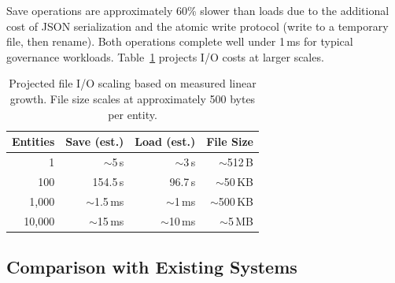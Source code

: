 \documentclass[10pt, twocolumn]{article}
\begin{document}
Save operations are approximately 60\% slower than loads due to the additional cost of JSON serialization and the atomic write protocol (write to a temporary file, then rename). Both operations complete well under 1\,ms for typical governance workloads. Table~\ref{tab:io-scale} projects I/O costs at larger scales.

\begin{table}[t]
\caption{Projected file I/O scaling based on measured linear growth. File size scales at approximately 500 bytes per entity.}
\label{tab:io-scale}
\centering
\small
\begin{tabular}{@{}rrrr@{}}
\toprule
\textbf{Entities} & \textbf{Save (est.)} & \textbf{Load (est.)} & \textbf{File Size} \\
\midrule
1 & $\sim$5\,\textmu{}s & $\sim$3\,\textmu{}s & $\sim$512\,B \\
100 & 154.5\,\textmu{}s & 96.7\,\textmu{}s & $\sim$50\,KB \\
1{,}000 & $\sim$1.5\,ms & $\sim$1\,ms & $\sim$500\,KB \\
10{,}000 & $\sim$15\,ms & $\sim$10\,ms & $\sim$5\,MB \\
\bottomrule
\end{tabular}
\end{table}

\subsection{Comparison with Existing Systems}
\end{document}

